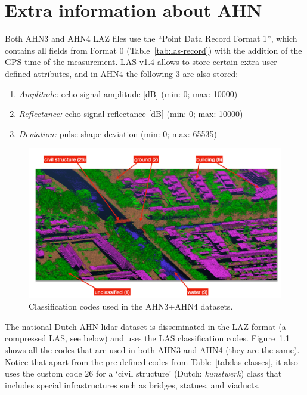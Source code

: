 
\graphicspath{{appendices/ahn/figs/}}

\chapter{Extra information about AHN}%
\label{app:ahn}



Both AHN3 and AHN4 LAZ files use the ``Point Data Record Format 1'', which contains all fields from Format 0 (Table~\ref{tab:las-record}) with the addition of the GPS time of the measurement.
LAS v1.4 allows to store certain extra user-defined attributes, and in AHN4 the following 3 are also stored:
\begin{enumerate}
  \item \emph{Amplitude:} echo signal amplitude [dB] (min: 0; max: 10000) 
  \item \emph{Reflectance:} echo signal reflectance [dB] (min: 0; max: 10000)
  \item \emph{Deviation:} pulse shape deviation (min: 0; max: 65535)
\end{enumerate}

%


\begin{figure}[t]
  \includegraphics[width=\linewidth]{ahn4.png}
  \caption{Classification codes used in the AHN3+AHN4 datasets.}%
\label{fig:ahn3}
\end{figure}
The national Dutch AHN lidar dataset 
is disseminated in the LAZ format (a compressed LAS, see below) and uses the LAS classification codes. 
Figure~\ref{fig:ahn3} shows all the codes that are used in both AHN3 and AHN4 (they are the same). 
Notice that apart from the pre-defined codes from Table~\ref{tab:las-classes}, it also uses the custom code $26$ for a `civil structure' (Dutch: \emph{kunstwerk}) class that includes special infrastructures such as bridges, statues, and viaducts. 

